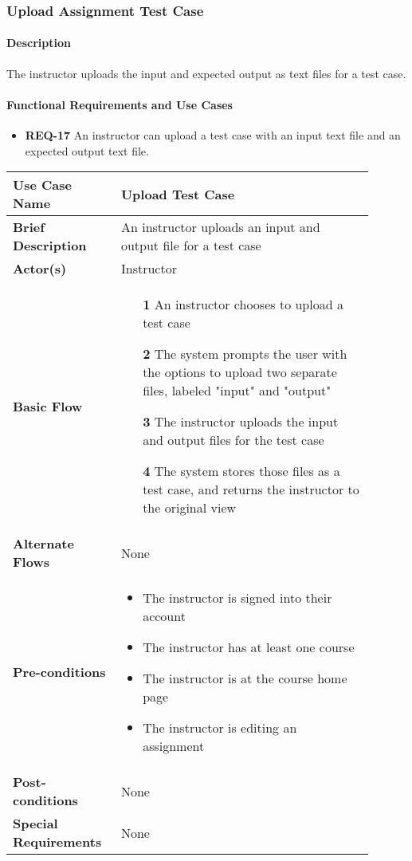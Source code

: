 \documentclass{article}
\begin{document}
\subsubsection{Upload Assignment Test Case}

\paragraph{Description} The instructor uploads the input and expected output as text files for a test case.

\paragraph{Functional Requirements and Use Cases}

\begin{itemize}
  \item \textbf{REQ-17} An instructor can upload a test case with an input text file and an expected output text file.
\end{itemize}

\vspace{0.1in}

\begin{tabular}{| p{0.25\linewidth} | p{0.65\linewidth} |}
  \hline
  \textbf{Use Case Name} & Upload Test Case \\
  \hline
  \textbf{Brief Description} & An instructor uploads an input and output file for a test case  \\
  \hline
  \textbf{Actor(s)} & Instructor \\
  \hline
  \textbf{Basic Flow} & \begin{itemize}
    \item[\textbf{1}] An instructor chooses to upload a test case
    \item[\textbf{2}] The system prompts the user with the options to upload two separate files, labeled "input" and "output"
    \item[\textbf{3}] The instructor uploads the input and output files for the test case
    \item[\textbf{4}] The system stores those files as a test case, and returns the instructor to the original view
  \end{itemize}\\
  \hline
  \textbf{Alternate Flows} & None \\
  \hline
  \textbf{Pre-conditions} & \begin{itemize}
    \item The instructor is signed into their account
    \item The instructor has at least one course
    \item The instructor is at the course home page
    \item The instructor is editing an assignment
  \end{itemize} \\
  \hline
  \textbf{Post-conditions} & None \\
  \hline
  \textbf{Special Requirements} & None \\
  \hline
\end{tabular}
\end{document}
